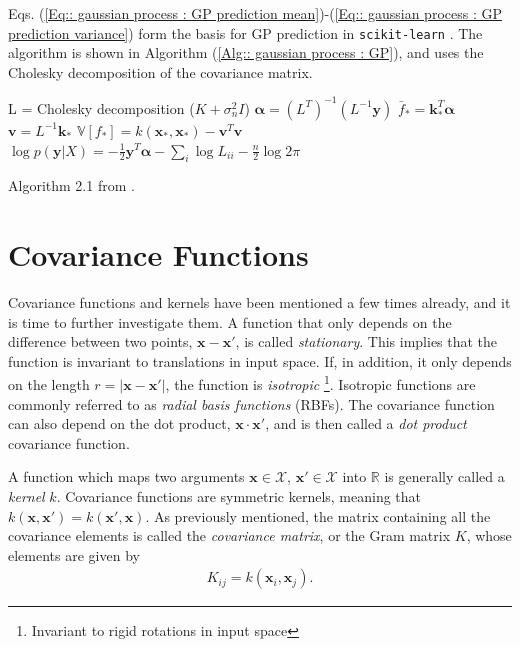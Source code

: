 \documentclass[twoside,english]{uiofysmaster}
\begin{document}
Eqs. (\ref{Eq:: gaussian process : GP prediction mean})-(\ref{Eq:: gaussian process : GP prediction variance}) form the basis for GP prediction in \verb|scikit-learn|  \cite{scikit-learn}. The algorithm is shown in Algorithm (\ref{Alg:: gaussian process : GP}), and uses the Cholesky decomposition of the covariance matrix.

\begin{algorithm}
L = Cholesky decomposition ($K + \sigma_n^2 I$) \;
$\boldsymbol{\alpha} = (L^T)^{-1}(L^{-1} \textbf{y})$ \;
$\bar{f}_* = \textbf{k}_*^T \boldsymbol{\alpha}$ \;
$\textbf{v} = L^{-1} \textbf{k}_*$ \;
$\mathbb{V}[f_*] = k(\textbf{x}_*, \textbf{x}_*) - \textbf{v}^T \textbf{v}$ \;
$\log p(\textbf{y}|X) = - \frac{1}{2} \textbf{y}^T \boldsymbol{\alpha} - \sum_i \log L_{ii} - \frac{n}{2} \log 2 \pi$ \;
\caption{Algorithm 2.1 from \cite{rasmussen2006gaussian}.}
\label{Alg:: gaussian process : GP}
\end{algorithm}

\section{Covariance Functions}
Covariance functions and kernels have been mentioned a few times already, and it is time to further investigate them. A function that only depends on the difference between two points, $\textbf{x} - \textbf{x}'$, is called \textit{stationary}. This implies that the function is invariant to translations in input space. If, in addition, it only depends on the length $r=|\textbf{x}-\textbf{x}'|$, the function is \textit{isotropic} \footnote{Invariant to rigid rotations in input space}.  Isotropic functions are commonly referred to as \textit{radial basis functions} (RBFs). The covariance function can also depend on the dot product, $\textbf{x} \cdot \textbf{x}'$, and is then called a \textit{dot product} covariance function.

A function which maps two arguments $\textbf{x} \in \mathcal{X}$, $\textbf{x}' \in \mathcal{X}$ into $\mathbb{R}$ is generally called a \textit{kernel} $k$. Covariance functions are symmetric kernels, meaning that $k(\textbf{x}, \textbf{x}') = k(\textbf{x}', \textbf{x})$. As previously mentioned, the matrix containing all the covariance elements is called the \textit{covariance matrix}, or the Gram matrix $K$, whose elements are given by
\begin{align}\label{Eq:: covariance matrix}
K_{ij} = k(\textbf{x}_i, \textbf{x}_j).
\end{align}
\end{document}
